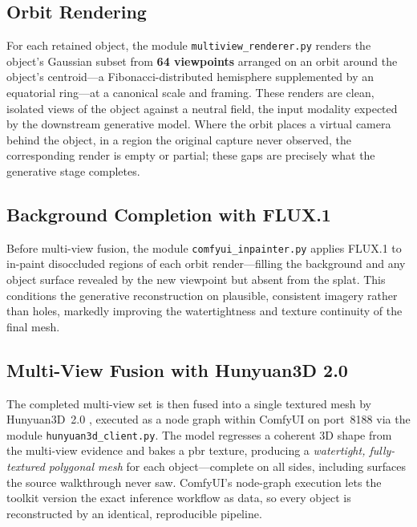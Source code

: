 \subsection{Orbit Rendering}
\label{sec:sg-orbit}

For each retained object, the module \texttt{multiview\_renderer.py} renders the object's Gaussian subset from \textbf{64 viewpoints} arranged on an orbit around the object's centroid---a Fibonacci-distributed hemisphere supplemented by an equatorial ring---at a canonical scale and framing. These renders are clean, isolated views of the object against a neutral field, the input modality expected by the downstream generative model. Where the orbit places a virtual camera behind the object, in a region the original capture never observed, the corresponding render is empty or partial; these gaps are precisely what the generative stage completes.

\subsection{Background Completion with FLUX.1}
\label{sec:sg-flux}

Before multi-view fusion, the module \texttt{comfyui\_inpainter.py} applies FLUX.1 \parencite{FLUX2024} to in-paint disoccluded regions of each orbit render---filling the background and any object surface revealed by the new viewpoint but absent from the splat. This conditions the generative reconstruction on plausible, consistent imagery rather than holes, markedly improving the watertightness and texture continuity of the final mesh.

\subsection{Multi-View Fusion with Hunyuan3D 2.0}
\label{sec:sg-hunyuan}

The completed multi-view set is then fused into a single textured mesh by Hunyuan3D~2.0 \parencite{Zhao2025Hunyuan}, executed as a node graph within ComfyUI \parencite{ComfyUI2024} on port~8188 via the module \texttt{hunyuan3d\_client.py}. The model regresses a coherent 3D shape from the multi-view evidence and bakes a \acrshort{pbr} texture, producing a \emph{watertight, fully-textured polygonal mesh} for each object---complete on all sides, including surfaces the source walkthrough never saw. ComfyUI's node-graph execution lets the toolkit version the exact inference workflow as data, so every object is reconstructed by an identical, reproducible pipeline.

